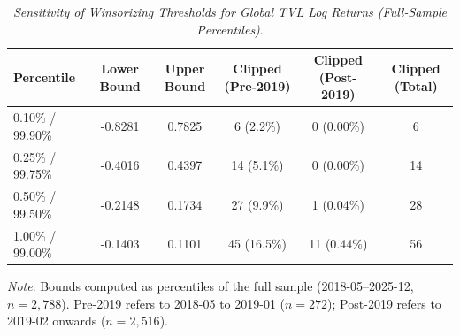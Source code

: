 \begin{table}[h]
  \centering
  \caption{\textit{Sensitivity of Winsorizing Thresholds for Global TVL Log Returns (Full-Sample Percentiles)}.}
  \label{tab:winsortvl20182025}
  \begin{tabular}{lccccc}
    \toprule
    \textbf{Percentile} & \textbf{Lower Bound} & \textbf{Upper Bound} & \textbf{Clipped (Pre-2019)} & \textbf{Clipped (Post-2019)} & \textbf{Clipped (Total)} \\ 
    \midrule
    0.10\% / 99.90\% & -0.8281 & 0.7825 & 6 (2.2\%) & 0 (0.00\%) & 6 \\ 
    0.25\% / 99.75\% & -0.4016 & 0.4397 & 14 (5.1\%) & 0 (0.00\%) & 14 \\ 
    0.50\% / 99.50\% & -0.2148 & 0.1734 & 27 (9.9\%) & 1 (0.04\%) & 28 \\ 
    1.00\% / 99.00\% & -0.1403 & 0.1101 & 45 (16.5\%) & 11 (0.44\%) & 56 \\ 
    \bottomrule
  \end{tabular}
  \vspace{2pt}
  \footnotesize{\textit{Note}: Bounds computed as percentiles of the full sample (2018-05--2025-12, $n=2{,}788$). Pre-2019 refers to 2018-05 to 2019-01 ($n=272$); Post-2019 refers to 2019-02 onwards ($n=2{,}516$).}\\
\end{table}